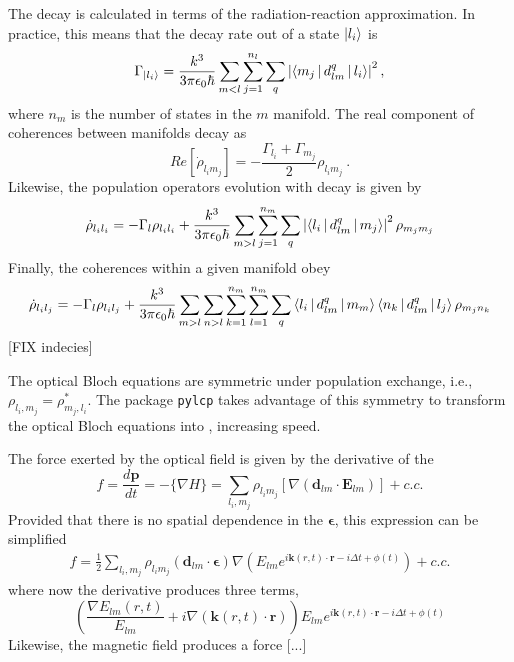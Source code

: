 \documentclass[final,5p,times,twocolumn]{elsarticle}
\newcounter{bla}
\begin{document}
The decay is calculated in terms of the radiation-reaction approximation.  In practice, this means that the decay rate out of a state $\ket{l_i}$ is
\begin{equation}
    \Gamma_{\ket{l_i}} = \frac{k^3}{3\pi\epsilon_0\hbar}\sum_{m<l}\sum_{j=1}^{n_l}\sum_q \left|\Braket{m_j|d_{lm}^{q}|l_i}\right|^2,
\end{equation}
where $n_m$ is the number of states in the $m$ manifold.  The real component of coherences between manifolds decay as 
\begin{equation}
	Re[\dot{\rho}_{l_im_j}] = -\frac{\Gamma_{l_i}+\Gamma_{m_j}}{2}\rho_{l_im_j}\ .
\end{equation}
Likewise, the population operators evolution with decay is given by
\begin{equation}
	\dot{\rho}_{l_il_i} = -\Gamma_l\rho_{l_il_i} + \frac{k^3}{3\pi\epsilon_0\hbar}\sum_{m>l}\sum_{j=1}^{n_m}\sum_q \left|\Braket{l_i|d_{lm}^{q}|m_j}\right|^2 \rho_{m_jm_j}
\end{equation} 
Finally, the coherences within a given manifold obey
\begin{equation}
	\dot{\rho}_{l_il_j} = -\Gamma_l\rho_{l_il_j} + \frac{k^3}{3\pi\epsilon_0\hbar}\sum_{m>l}\sum_{n>l}\sum_{k=1}^{n_m}\sum_{l=1}^{n_m}\sum_q \Braket{l_i|d_{lm}^{q}|m_m}\Braket{n_k|d_{lm}^{q}|l_j}\rho_{m_jn_k}
\end{equation} 
[FIX indecies]

The optical Bloch equations are symmetric under population exchange, i.e., $\rho_{l_i, m_j} = \rho^*_{m_j, l_i}$.  The package {\tt pylcp} takes advantage of this symmetry to transform the optical Bloch equations into , increasing speed.

The force exerted by the optical field is given by the derivative of the 
\begin{equation}
	f = \frac{d\mathbf{p}}{dt} = -\{\nabla H\} = \sum_{l_i,m_j} \rho_{l_im_j}\left[\nabla(\boldsymbol{d}_{lm}\cdot \mathbf{E}_{lm})\right] + c.c.
\end{equation}
Provided that there is no spatial dependence in the $\boldsymbol{\epsilon}$, this expression can be simplified 
\begin{eqnarray}
	f = \frac{1}{2}\sum_{l_i,m_j} \rho_{l_im_j}\left(\boldsymbol{d}_{lm}\cdot \boldsymbol{\epsilon}\right) \nabla \left(E_{lm}e^{i\mathbf{k}(r,t)\cdot\mathbf{r}-i \Delta t + \phi(t)}\right) + c.c.
\end{eqnarray}
where now the derivative produces three terms, 
\begin{equation}
	\left(\frac{\nabla E_{lm}(r,t)}{E_{lm}} + i \nabla (\mathbf{k}(r,t)\cdot \mathbf{r})\right)E_{lm}e^{i\mathbf{k}(r,t)\cdot\mathbf{r}-i \Delta t + \phi(t)}
\end{equation}
Likewise, the magnetic field produces a force [...]
\end{document}
